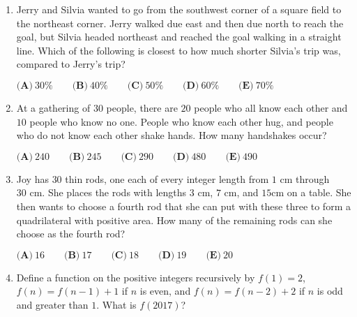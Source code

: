 \documentclass{article}
\begin{document}
\begin{enumerate}[label=\arabic*., itemsep=0.5em]
$ \textbf{(A)}\ \text{ If Lewis did not receive an A, then he got all of the multiple choice questions wrong.} \\ \qquad\textbf{(B)}\ \text{ If Lewis did not receive an A, then he got at least one of the multiple choice questions wrong.} \\ \qquad\textbf{(C)}\ \text{ If Lewis got at least one of the multiple choice questions wrong, then he did not receive an A.} \\ \qquad\textbf{(D)}\ \text{ If Lewis received an A, then he got all of the multiple choice questions right.} \\ \qquad\textbf{(E)}\ \text{ If Lewis received an A, then he got at least one of the multiple choice questions right.} $\par \vspace{0.5em}\item Jerry and Silvia wanted to go from the southwest corner of a square field to the northeast corner. Jerry walked due east and then due north to reach the goal, but Silvia headed northeast and reached the goal walking in a straight line. Which of the following is closest to how much shorter Silvia's trip was, compared to Jerry's trip?

$\textbf{(A)}\ 30\%\qquad\textbf{(B)}\ 40\%\qquad\textbf{(C)}\ 50\%\qquad\textbf{(D)}\ 60\%\qquad\textbf{(E)}\ 70\%$\par \vspace{0.5em}\item At a gathering of $30$ people, there are $20$ people who all know each other and $10$ people who know no one. People who know each other hug, and people who do not know each other shake hands. How many handshakes occur?

$\textbf{(A)}\ 240\qquad\textbf{(B)}\ 245\qquad\textbf{(C)}\ 290\qquad\textbf{(D)}\ 480\qquad\textbf{(E)}\ 490$\par \vspace{0.5em}\item Joy has $30$ thin rods, one each of every integer length from $1 \text{ cm}$ through $30 \text{ cm}$. She places the rods with lengths $3 \text{ cm}$, $7 \text{ cm}$, and $15 \text{cm}$ on a table. She then wants to choose a fourth rod that she can put with these three to form a quadrilateral with positive area. How many of the remaining rods can she choose as the fourth rod?

$\textbf{(A)}\ 16 \qquad\textbf{(B)}\ 17 \qquad\textbf{(C)}\ 18 \qquad\textbf{(D)}\ 19  \qquad\textbf{(E)}\ 20$\par \vspace{0.5em}\item Define a function on the positive integers recursively by $f(1) = 2$, $f(n) = f(n-1) + 1$ if $n$ is even, and $f(n) = f(n-2) + 2$ if $n$ is odd and greater than $1$. What is $f(2017)$?


\end{enumerate}
\end{document}
